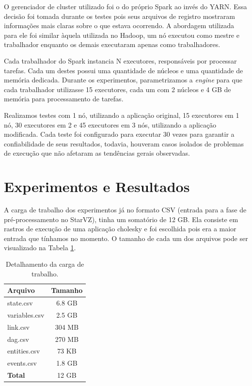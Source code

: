 O gerenciador de cluster utilizado foi o do próprio Spark ao invés do YARN. 
Essa decisão foi tomada durante os testes pois seus arquivos de registro 
mostraram informações mais claras sobre o que estava ocorrendo. A abordagem 
utilizada para ele foi similar àquela utilizada no Hadoop, um nó executou 
como mestre e trabalhador enquanto os demais executaram apenas como 
trabalhadores. 

Cada trabalhador do Spark instancia N executores, responsáveis 
por processar tarefas. Cada um destes possui uma quantidade de núcleos e uma 
quantidade de memória dedicada. Durante os experimentos, parametrizamos a 
\textit{engine} para que cada trabalhador utilizasse 15 executores, cada um com 
2 núcleos e 4 GB de memória para processamento de tarefas.

Realizamos testes com 1 nó, utilizando a aplicação original, 15 executores em 1 
nó, 30 executores em 2 e 45 executores em 3 nós, utilizando a aplicação 
modificada. Cada teste foi configurado para executar 30 vezes para garantir a 
confiabilidade de seus resultados, todavia, houveram casos isolados de problemas 
de execução que não afetaram as tendências gerais observadas.


\section{Experimentos e Resultados} \label{sect:results}

A carga de trabalho dos experimentos já no formato CSV (entrada para a fase de 
pré-processamento no StarVZ), tinha um somatório de 12 GB. Ela consiste em 
rastros de execução de uma aplicação cholesky e foi escolhida pois era a maior
entrada que tínhamos no momento. O tamanho de cada um dos arquivos pode ser 
visualizado na Tabela \ref{tab:input_sz}.

\begin{table}[H]
\centering
\small
\begin{tabular}{l c} \toprule
\textbf{Arquivo}  &  \textbf{Tamanho} \\ 
\midrule
state.csv	& 6.8 GB \\
variables.csv  	& 2.5 GB \\
link.csv       	& 304 MB \\
dag.csv        	& 270 MB \\
entities.csv	& 73 KB \\
events.csv	& 1.8 GB \\
\textbf{Total}  & 12 GB  \\
\end{tabular}
\caption{Detalhamento da carga de trabalho.}
\label{tab:input_sz}
\end{table}

